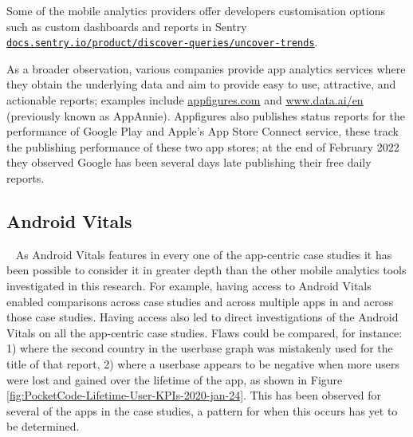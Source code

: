 Some of the mobile analytics providers offer developers customisation options such as custom dashboards and reports in Sentry \href{https://docs.sentry.io/product/discover-queries/uncover-trends/}{\nolinkurl{docs.sentry.io/product/discover-queries/uncover-trends}}.

As a broader observation, various companies provide app analytics services where they obtain the underlying data %
and aim to provide easy to use, attractive, and actionable reports; examples include \href{https://appfigures.com/}{appfigures.com} and \href{https://www.data.ai/en/}{www.data.ai/en} (previously known as AppAnnie). Appfigures also publishes status reports for the performance of Google Play and Apple's App Store Connect service, these track the publishing performance of these two app stores; at the end of February 2022 they observed Google has been several days late publishing their free daily reports. %


\subsection{Android Vitals}~\label{tata-android-vitals-topic}
As Android Vitals features in every one of the app-centric case studies it has been possible to consider it in greater depth than the other mobile analytics tools investigated in this research. For example, having access to Android Vitals enabled comparisons across case studies and across multiple apps in and across those case studies. Having access also led to direct investigations of the Android Vitals on all the app-centric case studies. Flaws could be compared, for instance: 1) where the second country in the userbase graph was mistakenly used for the title of that report, 2) where a userbase appears to be negative when more users were lost and gained over the lifetime of the app, as shown in Figure \ref{fig:PocketCode-Lifetime-User-KPIs-2020-jan-24}. This has been observed for several of the apps in the case studies, a pattern for when this occurs has yet to be determined.


